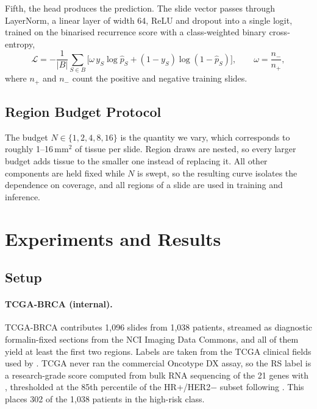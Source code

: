 \documentclass{midl} %
\begin{document}
Fifth, the head produces the prediction. The slide vector passes through LayerNorm, a linear
layer of width 64, ReLU and dropout into a single logit, trained on the binarised recurrence
score with a class-weighted binary cross-entropy,
\begin{equation}
\label{eq:loss}
\mathcal{L} = -\frac{1}{|B|} \sum_{S \in B} \Big[ \omega\, y_S \log \hat{p}_S
+ (1 - y_S) \log (1 - \hat{p}_S) \Big], \qquad \omega = \frac{n_{-}}{n_{+}},
\end{equation}
where $n_{+}$ and $n_{-}$ count the positive and negative training slides.

\subsection{Region Budget Protocol}
\label{sec:region-sampling-protocol}

The budget $N \in \{1, 2, 4, 8, 16\}$ is the quantity we vary, which corresponds to roughly
1--16\,mm$^2$ of tissue per slide. Region draws are nested, so every larger budget adds tissue
to the smaller one instead of replacing it. All other components are held fixed while $N$ is
swept, so the resulting curve isolates the dependence on coverage, and all regions of a slide
are used in training and inference.
\section{Experiments and Results}
\label{sec:experiments}


\subsection{Setup}
\label{sec:setup}
\paragraph{TCGA-BRCA (internal).}
TCGA-BRCA contributes 1,096 slides from 1,038 patients, streamed as diagnostic
formalin-fixed sections from the NCI Imaging Data Commons, and all of them yield at least the
first two regions. Labels are taken from the TCGA clinical fields used by \citet{guo2026}.
TCGA never ran the commercial Oncotype DX assay, so the RS label is a research-grade score
computed from bulk RNA sequencing of the 21 genes with  \citep{paik2004},
thresholded at the 85th percentile of the HR+/HER2$-$ subset following \citet{howard2024}.
This places 302 of the 1,038 patients in the high-risk class.
\end{document}
